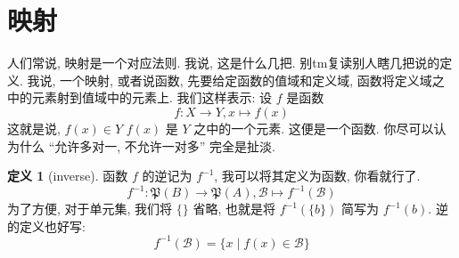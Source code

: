 \documentclass[10pt]{ctexart}
\theoremstyle{definition}
\theoremstyle{definition}
\newtheorem{definition}{定义}[section]
\theoremstyle{plain}
\theoremstyle{remark}
\begin{document}
\section{映射}
人们常说, 映射是一个对应法则. 我说, 这是什么几把. 别tm复读别人瞎几把说的定义. 我说, 一个映射, 或者说函数, 先要给定函数的值域和定义域, 函数将定义域之中的元素射到值域中的元素上. 我们这样表示: 设 \(f\) 是函数
\begin{equation}
f \colon X \to Y , x \mapsto f (x) 
\end{equation}
这就是说, \(f (x) \in Y\) \(f (x) \) 是 \(Y\) 之中的一个元素. 这便是一个函数. 你尽可以认为什么 ``允许多对一, 不允许一对多'' 完全是扯淡. 
\begin{definition}[inverse]
函数 \(f\) 的逆记为 \(f ^{-1}\), 我可以将其定义为函数, 你看就行了. 
\begin{equation}
f^{-1} \colon \mathfrak P (B) \to \mathfrak P(A) , \mathcal B \mapsto f ^{-1} (\mathcal B) 
\end{equation}
为了方便, 对于单元集, 我们将 \(\{ \}\) 省略, 也就是将 \(f ^{-1} (\{b \} ) \) 简写为 \(f ^{-1} (b)\). 逆的定义也好写: 
\begin{equation}
f ^{-1} (\mathcal B ) = \{ x \mid f(x) \in \mathcal B \} 
\end{equation}
\end{definition}
\end{document}
